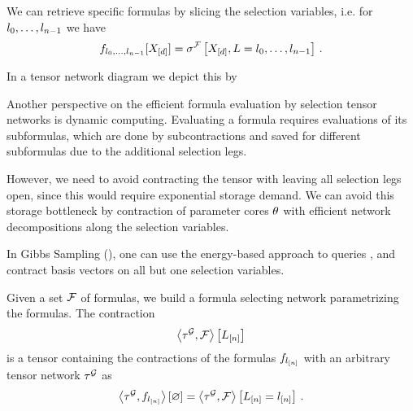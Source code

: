 We can retrieve specific formulas by slicing the selection variables, i.e. for $l_{0},\ldots,l_{n-1}$ we have
\[ f_{l_{0},\ldots,l_{n-1}}[X_{[d]}] = \sigma^{\mathcal{F}}\left[X_{[d]},L=l_{0},\ldots,l_{n-1}\right] \, .  \]

In a tensor network diagram we depict this by
\begin{center}
    
\end{center}

Another perspective on the efficient formula evaluation by selection tensor networks is dynamic computing.
Evaluating a formula requires evaluations of its subformulas, which are done by subcontractions and saved for different subformulas due to the additional selection legs.

However, we need to avoid contracting the tensor with leaving all selection legs open, since this would require exponential storage demand.
We can avoid this storage bottleneck by contraction of parameter cores $\theta$ with efficient network decompositions along the selection variables. %

In Gibbs Sampling (), one can use the energy-based approach to queries , and contract basis vectors on all but one selection variables.





Given a set $\mathcal{F}$ of formulas, we build a formula selecting network parametrizing the formulas.
The contraction
\begin{align*}
    \left\langle \tau^{\mathcal{G}},\mathcal{F}\right\rangle \left[ L_{[n]} \right]
\end{align*}
is a tensor containing the contractions of the formulas $f_{l_{[n]}}$ with an arbitrary tensor network $\tau^{\mathcal{G}}$ as
\begin{align*}
    \left\langle \tau^{\mathcal{G}},f_{l_{[n]}}\right\rangle \left[ \varnothing \right] = \left\langle \tau^{\mathcal{G}},\mathcal{F}\right\rangle \left[ L_{[n]}=l_{[n]} \right] \, .
\end{align*}


